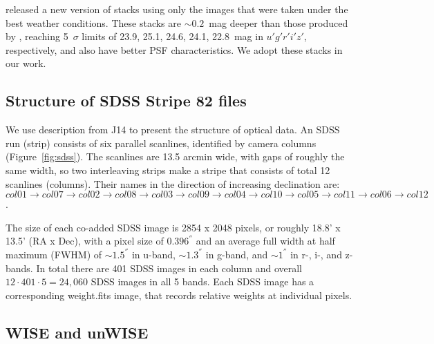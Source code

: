 \documentclass[numberedappendix,apj,twocolumn]{emulateapj}
\begin{document}
\citet[][hereafter J14]{Jiang2014} released a new version of stacks using only the images that were taken under the best weather conditions. These stacks are $\sim0.2$~mag deeper than those produced by \citet[][]{Annis2014}, reaching 5~$\sigma$ limits of 23.9, 25.1, 24.6, 24.1, 22.8~mag in $u' g' r' i' z'$, respectively, and also have better PSF characteristics. We adopt these stacks in our work.

\subsection{Structure of SDSS Stripe 82 files}

	We use description from J14 to present the structure of optical data. An SDSS run (strip) consists of six parallel scanlines, identified by camera columns (Figure~\ref{fig:sdss}). The scanlines are 13.5 arcmin wide, with gaps of roughly the same width, so two interleaving strips make a stripe that consists of total 12 scanlines (columns). Their names in the direction of increasing declination are:
$col01 \rightarrow col07 \rightarrow col02 \rightarrow col08 \rightarrow col03 \rightarrow col09 \rightarrow col04 \rightarrow col10 \rightarrow col05 \rightarrow col11 \rightarrow col06 \rightarrow col12$.


The size of each co-added SDSS image is 2854 x 2048 pixels, or roughly 18.8' x 13.5' (RA x Dec), with a pixel size of $0.396^{''}$ and an average full width at half maximum (FWHM) of $\sim1.5^{''}$ in u-band, $\sim1.3^{''}$ in g-band, and $\sim1^{''}$ in r-, i-, and z-bands. In total there are 401 SDSS images in each column and overall $12 \cdot 401 \cdot 5 = 24,060$ SDSS images in all 5 bands. Each SDSS image has a corresponding weight.fits image, that records relative weights at individual pixels.

\subsection{WISE and unWISE}
\end{document}
